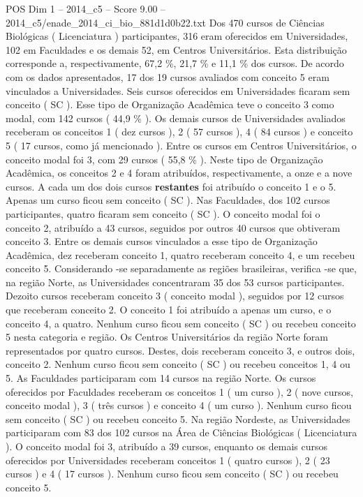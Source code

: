\begin{textsample}{POS Dim 1 – 2014\_c5 – Score 9.00 – 2014\_c5/enade\_2014\_ci\_bio\_881d1d0b22.txt}
Dos 470 cursos de Ciências Biológicas ( Licenciatura ) participantes, 316 eram oferecidos em Universidades, 102 em Faculdades e os demais 52, em Centros Universitários.
Esta distribuição corresponde a, respectivamente, 67,2 \%, 21,7 \% e 11,1 \% dos cursos.
De acordo com os dados apresentados, 17 dos 19 cursos avaliados com conceito 5 eram vinculados a Universidades.
Seis cursos oferecidos em Universidades ficaram sem conceito ( SC ).
Esse tipo de Organização Acadêmica teve o conceito 3 como modal, com 142 cursos ( 44,9 \% ).
Os demais cursos de Universidades avaliados receberam os conceitos 1 ( dez cursos ), 2 ( 57 cursos ), 4 ( 84 cursos ) e conceito 5 ( 17 cursos, como já mencionado ).
Entre os cursos em Centros Universitários, o conceito modal foi 3, com 29 cursos ( 55,8 \% ).
Neste tipo de Organização Acadêmica, os conceitos 2 e 4 foram atribuídos, respectivamente, a onze e a nove cursos.
A cada um dos dois cursos \textbf{restantes} foi atribuído o conceito 1 e o 5.
Apenas um curso ficou sem conceito ( SC ).
Nas Faculdades, dos 102 cursos participantes, quatro ficaram sem conceito ( SC ).
O conceito modal foi o conceito 2, atribuído a 43 cursos, seguidos por outros 40 cursos que obtiveram conceito 3.
Entre os demais cursos vinculados a esse tipo de Organização Acadêmica, dez receberam conceito 1, quatro receberam conceito 4, e um recebeu conceito 5.
Considerando -se separadamente as regiões brasileiras, verifica -se que, na região Norte, as Universidades concentraram 35 dos 53 cursos participantes.
Dezoito cursos receberam conceito 3 ( conceito modal ), seguidos por 12 cursos que receberam conceito 2.
O conceito 1 foi atribuído a apenas um curso, e o conceito 4, a quatro.
Nenhum curso ficou sem conceito ( SC ) ou recebeu conceito 5 nesta categoria e região.
Os Centros Universitários da região Norte foram representados por quatro cursos.
Destes, dois receberam conceito 3, e outros dois, conceito 2.
Nenhum curso ficou sem conceito ( SC ) ou recebeu conceitos 1, 4 ou 5.
As Faculdades participaram com 14 cursos na região Norte.
Os cursos oferecidos por Faculdades receberam os conceitos 1 ( um curso ), 2 ( nove cursos, conceito modal ), 3 ( três cursos ) e conceito 4 ( um curso ).
Nenhum curso ficou sem conceito ( SC ) ou recebeu conceito 5.
Na região Nordeste, as Universidades participaram com 83 dos 102 cursos na Área de Ciências Biológicas ( Licenciatura ).
O conceito modal foi 3, atribuído a 39 cursos, enquanto os demais cursos oferecidos por Universidades receberam conceitos 1 ( quatro cursos ), 2 ( 23 cursos ) e 4 ( 17 cursos ).
Nenhum curso ficou sem conceito ( SC ) ou recebeu conceito 5.

\end{textsample}
